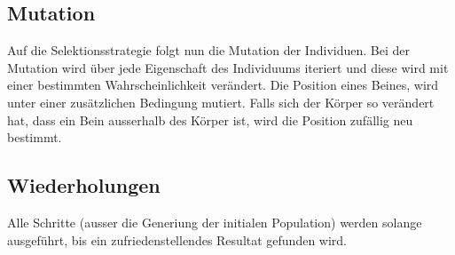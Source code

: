     \subsection{Mutation\label{sec:Mutation}}

      Auf die Selektionsstrategie folgt nun die Mutation der Individuen.
      Bei der Mutation wird über jede Eigenschaft des Individuums iteriert und
      diese wird mit einer bestimmten Wahrscheinlichkeit verändert. Die Position eines Beines,
      wird unter einer zusätzlichen Bedingung mutiert. Falls sich der Körper so verändert hat,
      dass ein Bein ausserhalb des Körper ist, wird die Position zufällig neu bestimmt.

    \subsection{Wiederholungen}
      Alle Schritte (ausser die Generiung der initialen Population) werden solange ausgeführt,
      bis ein zufriedenstellendes Resultat gefunden wird.
